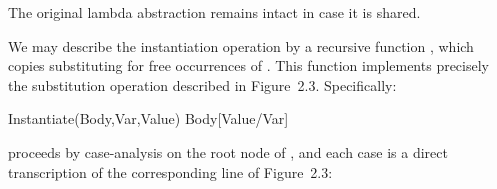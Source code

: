 
\noindent The original lambda abstraction remains intact in case it is shared.


We may describe the instantiation operation by a recursive function
, which copies  substituting  for free
occurrences of . This function implements precisely the substitution
operation described in Figure~2.3. Specifically:

\begin{mlcoded}
    Instantiate(Body,Var,Value) \quad Body[Value/Var]
\end{mlcoded}

\noindent {} proceeds by case-analysis on the root node of , and each case is
a direct transcription of the corresponding line of Figure~2.3:

